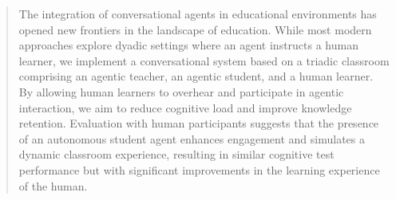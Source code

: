 

\begin{abstract}
\noindent
The integration of conversational agents in educational environments has opened new frontiers in the landscape of education. While most modern approaches explore dyadic settings where an agent instructs a human learner, we implement a conversational system based on a triadic classroom comprising an agentic teacher, an agentic student, and a human learner. By allowing human learners to overhear and participate in agentic interaction, we aim to reduce cognitive load and improve knowledge retention. Evaluation with human participants suggests that the presence of an autonomous student agent enhances engagement and simulates a dynamic classroom experience, resulting in similar cognitive test performance but with significant improvements in the learning experience of the human.

\end{abstract}

